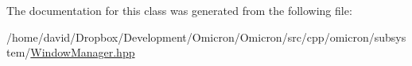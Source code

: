The documentation for this class was generated from the following file\+:\begin{DoxyCompactItemize}
\item 
/home/david/\+Dropbox/\+Development/\+Omicron/\+Omicron/src/cpp/omicron/subsystem/\hyperlink{_window_manager_8hpp}{Window\+Manager.\+hpp}\end{DoxyCompactItemize}
